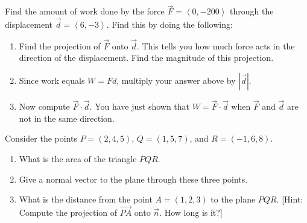 \begin{problem}\label{first work problem}
% 
Find the amount of work done by the force $\vec F=\left<0,-200\right>$ through the displacement $\vec d=\left<6,-3\right>$. Find this by doing the following:
\begin{enumerate}
\item Find the projection of $\vec F$ onto $\vec d$. This tells you how much force acts in the direction of the displacement. Find the magnitude of this projection.
\item Since work equals $W=Fd$, multiply your answer above by $|\vec {d}|$.  
\item Now compute $\vec F\cdot \vec d$. You have just shown that $W=\vec F\cdot \vec d$ when $\vec F$ and $\vec d$ are not in the same direction.
\end{enumerate}
\end{problem}


\begin{problem} 
%
 Consider the points $P=(2,4,5)$, $Q=(1,5,7)$, and $R=(-1,6,8)$.
\begin{enumerate}
 \item What is the area of the triangle $PQR$. 
 \item Give a normal vector to the plane through these three points.
 \item What is the distance from the point $A=(1,2,3)$ to the plane $PQR$.  [Hint: Compute the projection of $\vec {PA}$ onto $\vec n$.  How long is it?] 
\end{enumerate}

 
\end{problem}






